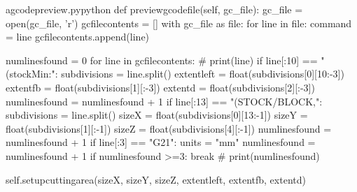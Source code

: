 \documentclass{ltxdoc}
\begin{document}
\lstset{firstnumber=\thegcpy}
\begin{writecode}{a}{gcodepreview.py}{python}
    def previewgcodefile(self, gc_file):
        gc_file = open(gc_file, 'r')
        gcfilecontents = []
        with gc_file as file:
            for line in file:
                command = line
                gcfilecontents.append(line)

        numlinesfound = 0
        for line in gcfilecontents:
#            print(line)
            if line[:10] == "(stockMin:":
                subdivisions = line.split()
                extentleft = float(subdivisions[0][10:-3])
                extentfb = float(subdivisions[1][:-3])
                extentd = float(subdivisions[2][:-3])
                numlinesfound = numlinesfound + 1
            if line[:13] == "(STOCK/BLOCK,":
                subdivisions = line.split()
                sizeX = float(subdivisions[0][13:-1])
                sizeY = float(subdivisions[1][:-1])
                sizeZ = float(subdivisions[4][:-1])
                numlinesfound = numlinesfound + 1
            if line[:3] == "G21":
                units = "mm"
                numlinesfound = numlinesfound + 1
            if numlinesfound >=3:
                break
#            print(numlinesfound)

        self.setupcuttingarea(sizeX, sizeY, sizeZ, extentleft, extentfb, extentd)


\end{writecode}
\end{document}
